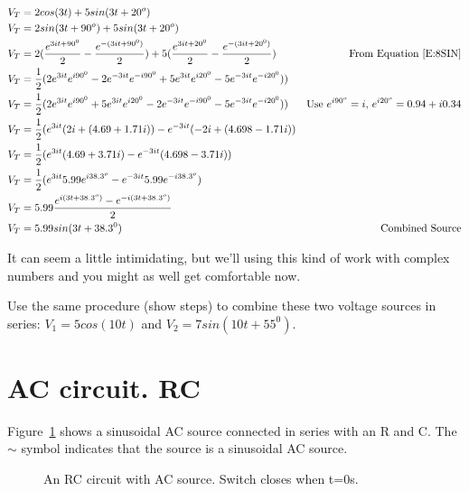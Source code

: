 \begin{align*}
V_T&=2cos(3 t)+5sin(3 t+20^o)\\
V_T&=2sin(3 t+90^o)+5sin(3 t+20^o)\\
V_T&=2(\frac{e^{3it+90^0}}{2}-\frac{e^{-(3it+90^0)}}{2})
		+5(\frac{e^{3it+20^0}}{2}-\frac{e^{-(3it+20^0)}}{2})&\text{From Equation~\eqref{E:8SIN}}\\
V_T&=\frac{1}{2}(2e^{3it}e^{i90^0}-2e^{-3it}e^{-i90^0}
		+5e^{3it}e^{i20^0}-5e^{-3it}e^{-i20^0}))\\
V_T&=\frac{1}{2}(2e^{3it}e^{i90^0}+5e^{3it}e^{i20^0}-2e^{-3it}e^{-i90^0}-5e^{-3it}e^{-i20^0}))
	&\text{Use $e^{i90^o}=i$, $e^{i20^o}=0.94+i0.34$}\\
V_T&=\frac{1}{2}(e^{3it}(2i+(4.69+1.71i))-e^{-3it}(-2i+(4.698-1.71i))\\
V_T&=\frac{1}{2}(e^{3it}(4.69+3.71i)-e^{-3it}(4.698-3.71i))\\
V_T&=\frac{1}{2}(e^{3it}5.99e^{i38.3^o}-e^{-3it}5.99e^{-i38.3^o})\\
V_T&=5.99\frac{e^{i(3t+38.3^o)}-e^{-i(3t+38.3^o)}}{2}\\
V_T&=5.99sin(3t+38.3^0) &\text{Combined Source}
\end{align*}

It can seem a little intimidating, but we'll using this kind of work with complex numbers and you might as well get comfortable now.

\begin{clevel}
Use the same procedure (show steps) to combine these two voltage sources in series: $V_1=5cos(10t)$ and $V_2=7sin(10t+55^0)$.
\end{clevel}


\section{AC circuit. RC}
Figure~\ref{F:8RC} shows a sinusoidal AC source connected in series with an R and C. The $\sim$ symbol indicates that the source is a sinusoidal AC source.

\begin{figure}[H]
\begin{center}
\caption{An RC circuit with AC source. Switch closes when t=0s.}
\label{F:8RC}
\end{center}
\end{figure}


